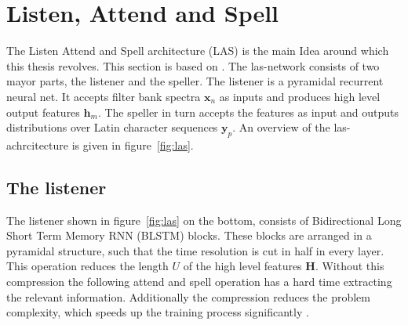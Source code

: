 \section{Listen, Attend and Spell}
The Listen Attend and Spell architecture (LAS) is the main Idea around which this thesis revolves. This section is based on \cite{Chan2015}. The las-network consists of two mayor parts, the listener and the speller. The listener is a pyramidal recurrent neural net. It accepts filter bank spectra $\mathbf{x}_n$ as inputs and produces high level output features $\mathbf{h}_m$. The speller in turn accepts the features as input and outputs distributions over Latin character sequences $\mathbf{y}_p$. An overview of the las-achrcitecture is given in figure~\ref*{fig:las}.

\subsection{The listener}
The listener shown in figure~\ref*{fig:las} on the bottom, consists of Bidirectional Long Short Term Memory RNN (BLSTM) blocks. These blocks are arranged in a pyramidal structure, such that the time resolution is cut in half in every layer. This operation reduces the length $U$ of the high level features $\mathbf{H}$. Without this compression the following attend and spell operation has a hard time extracting the relevant information. Additionally the compression reduces the problem complexity, which speeds up the training process significantly \cite[page 4]{Chan2015}.

